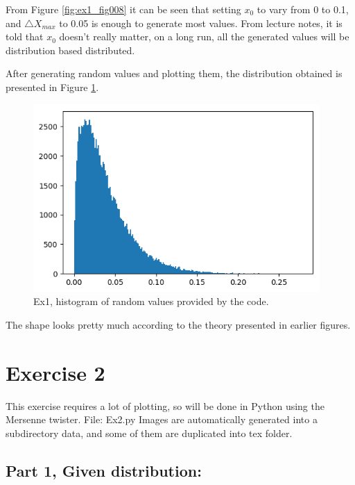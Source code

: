 \documentclass{article}
\begin{document}
From Figure \ref{fig:ex1_fig008} it can be seen that setting $x_0$ to vary from 0 to 0.1, and $\triangle X_{max}$ to 0.05 is enough to generate most values. From lecture notes, it is told that $x_0$ doesn't really matter, on a long run, all the generated values will be distribution based distributed.

After generating random values and plotting them, the distribution obtained is presented in Figure \ref{fig:ex1_myDistribution}.

\begin{figure}[!hbt]
	\centering
	\includegraphics[width=4.3in]{ex1_myDistribution}
	\caption{Ex1, histogram of random values provided by the code.}
	\label{fig:ex1_myDistribution}
\end{figure}

The shape looks pretty much according to the theory presented in earlier figures.


\clearpage

\section{Exercise 2}
This exercise requires a lot of plotting, so will be done in Python using the Mersenne twister. File: Ex2.py
Images are automatically generated into a subdirectory data, and some of them are duplicated into tex folder.

\subsection*{Part 1, Given distribution:}
\end{document}
